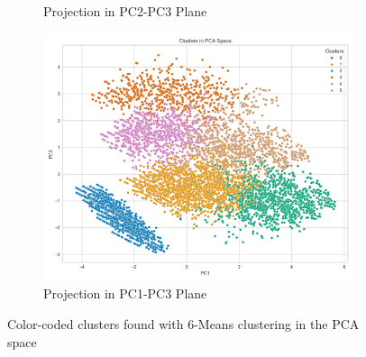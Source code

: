 \documentclass[a4paper,11pt]{article}
\begin{document}
\begin{figure}[h]
\begin{subfigure}{0.32\linewidth}
    \caption{Projection in PC2-PC3 Plane}
    \label{fig:cluster_23}
\end{subfigure}
\hfill
\begin{subfigure}{0.32\linewidth}
    \includegraphics[width=\textwidth]{figures/clustering/6-means_pca_13.png}
    \caption{Projection in PC1-PC3 Plane}
    \label{fig:cluster_13}
\end{subfigure}
\caption{Color-coded clusters found with 6-Means clustering in the PCA space}
\label{fig:clusters_pca}
\end{figure}
\end{document}
